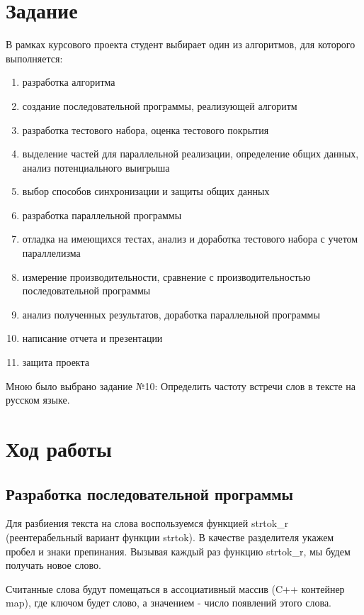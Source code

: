 \section{Задание}
В рамках курсового проекта студент выбирает один из алгоритмов, для которого выполняется:
\begin{enumerate}
\item разработка алгоритма
\item создание последовательной программы, реализующей алгоритм
\item разработка тестового набора, оценка тестового покрытия
\item выделение частей для параллельной реализации, определение общих данных, анализ потенциального выигрыша
\item выбор способов синхронизации и защиты общих данных
\item разработка параллельной программы
\item отладка на имеющихся тестах, анализ и доработка тестового набора с учетом параллелизма
\item измерение производительности, сравнение с производительностью последовательной программы
\item анализ полученных результатов, доработка параллельной программы
\item написание отчета и презентации
\item защита проекта
\end{enumerate}

Мною было выбрано задание №10: Определить частоту встречи слов в тексте на русском языке.

\section{Ход работы}
\subsection{Разработка последовательной программы}
Для разбиения текста на слова воспользуемся функцией strtok\_r (реентерабельный вариант функции strtok). В качестве разделителя укажем пробел и знаки препинания. Вызывая каждый раз функцию strtok\_r, мы будем получать новое слово.

Считанные слова будут помещаться в ассоциативный массив (C++ контейнер map), где ключом будет слово, а значением - число появлений этого слова.




